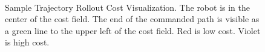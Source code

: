 \begin{figure}
\centering
{}
\hfill
{}
\\
\hfill
{}
\caption[Sample Trajectory Rollout Cost Visualization]{Sample Trajectory Rollout Cost Visualization. The robot is in the center of the cost field. The end of the commanded path is visible as a green line to the upper left of the cost field. Red is low cost. Violet is high cost.}
\label{fig:base_local_planner_cost_visualization}
\end{figure}

